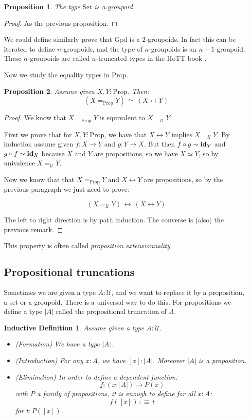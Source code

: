 \documentclass{article}
\newcommand{\sse}[1]{\medbreak \subsection{#1}}
\newcommand{\U}{{\mathcal U}}
\renewcommand{\r}{\rightarrow}
\newcommand{\id}{\mathrm{\bf id}}
\newcommand{\Set}{\mathrm{Set}}
\newcommand{\Prop}{\mathrm{Prop}}
\newcommand{\Gpd}{\mathrm{Gpd}}
\newtheorem{proposition}{Proposition}
\newtheorem{ind_def}{Inductive Definition}
\begin{document}
\begin{proposition}
The type $\Set$ is a groupoid.
\end{proposition}

\begin{proof}
As the previous proposition.
\end{proof}

We could define similarly prove that $\Gpd$ is a $2$-groupoids. In fact this can be iterated to define $n$-groupoids, and the type of $n$-groupoids is an $n+1$-groupoid. These $n$-groupoids are called $n$-truncated types in the HoTT book \cite{hottbook}.


Now we study the equality types in $\Prop$. %

\begin{proposition}
Assume given $X,Y:\Prop$. Then:
\[(X=_\Prop Y)\, \simeq \, (X\leftrightarrow Y)\]
\end{proposition}
\begin{proof}
We know that $X=_\Prop Y$ is equivalent to $X=_\U Y$. 

First we prove that for $X,Y:\Prop$, we have that $X\leftrightarrow Y$ implies $X=_\U Y$. By induction assume given $f:X\r Y$ and $g: Y\r X$. But then $f\circ g \sim \id_Y$ and $g\circ f\sim \id_X$ because $X$ and $Y$ are propositions, so we have $X\simeq Y$, so by univalence $X=_\U Y$.

Now we know that that $X=_\Prop Y$ and $X\leftrightarrow Y$ are propositions, so by the previous paragraph we just need to prove:

\[(X=_\U Y)\, \leftrightarrow \, (X\leftrightarrow Y)\]

The left to right direction is by path induction. The converse is (also) the previous remark.
\end{proof}

This property is often called \emph{proposition extensionnality}.


\sse{Propositional truncations}

Sometimes we are given a type $A:\U$, and we want to replace it by a proposition, a set or a groupoid. There is a universal way to do this. For propositions we define a type $|A|$ called the propositional truncation of $A$.

\begin{ind_def}
Assume given a type $A:\U$.
\begin{itemize}
\item (Formation) We have a type $|A|$.
\item (Introduction) For any $x:A$, we have $[x]:|A|$. Moreover $|A|$ is a proposition.
\item (Elimination) In order to define a dependent function: 
\[f:(x:|A|) \r P(x)\]
with $P$ a family of propositions, it is enough to define for all $x:A$:
\[f([x])\, :\equiv \, t\]
for $t:P([x])$.
\end{itemize}
\end{ind_def}
\end{document}

